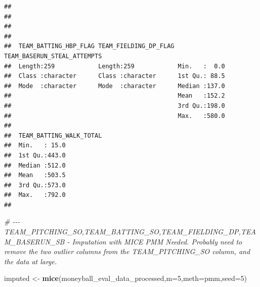 \documentclass[
]{article}
\newenvironment{Shaded}{\begin{snugshade}}{\end{snugshade}}
\newcommand{\AttributeTok}[1]{\textcolor[rgb]{0.13,0.29,0.53}{#1}}
\newcommand{\CommentTok}[1]{\textcolor[rgb]{0.56,0.35,0.01}{\textit{#1}}}
\newcommand{\DecValTok}[1]{\textcolor[rgb]{0.00,0.00,0.81}{#1}}
\newcommand{\FunctionTok}[1]{\textcolor[rgb]{0.13,0.29,0.53}{\textbf{#1}}}
\newcommand{\NormalTok}[1]{#1}
\newcommand{\OtherTok}[1]{\textcolor[rgb]{0.56,0.35,0.01}{#1}}
\newcommand{\StringTok}[1]{\textcolor[rgb]{0.31,0.60,0.02}{#1}}
\begin{document}
\begin{verbatim}
##                                                                
##                                                                
##                                                                
##                                                                
##  TEAM_BATTING_HBP_FLAG TEAM_FIELDING_DP_FLAG TEAM_BASERUN_STEAL_ATTEMPTS
##  Length:259            Length:259            Min.   :  0.0              
##  Class :character      Class :character      1st Qu.: 88.5              
##  Mode  :character      Mode  :character      Median :137.0              
##                                              Mean   :152.2              
##                                              3rd Qu.:198.0              
##                                              Max.   :580.0              
##                                                                         
##  TEAM_BATTING_WALK_TOTAL
##  Min.   : 15.0          
##  1st Qu.:443.0          
##  Median :512.0          
##  Mean   :503.5          
##  3rd Qu.:573.0          
##  Max.   :792.0          
## 
\end{verbatim}

\begin{Shaded}
\begin{Highlighting}[]
\CommentTok{\# {-}{-}{-} TEAM\_PITCHING\_SO,TEAM\_BATTING\_SO,TEAM\_FIELDING\_DP,TEAM\_BASERUN\_SB {-} Imputation with MICE PMM Needed. Probably need to remove the two outlier columns from the TEAM\_PITCHING\_SO column, and the data at large.}

\NormalTok{imputed }\OtherTok{\textless{}{-}} \FunctionTok{mice}\NormalTok{(moneyball\_eval\_data\_processed,}\AttributeTok{m=}\DecValTok{5}\NormalTok{,}\AttributeTok{meth=}\StringTok{\textquotesingle{}pmm\textquotesingle{}}\NormalTok{,}\AttributeTok{seed=}\DecValTok{5}\NormalTok{)}
\end{Highlighting}
\end{Shaded}
\end{document}

